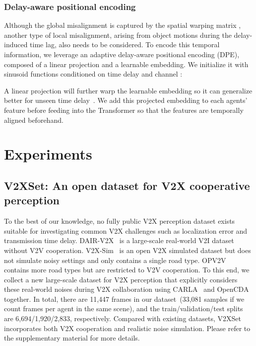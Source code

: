 \documentclass[runningheads]{llncs}
\begin{document}
\vspace{-3mm}
\subsubsection{Delay-aware positional encoding}
Although the global misalignment is captured by the spatial warping matrix , another type of local misalignment, arising from object motions during the delay-induced time lag, also needs to be considered.
To encode this temporal information, we leverage an adaptive delay-aware positional encoding (DPE), composed of a linear projection and a learnable embedding. We initialize it with sinusoid functions conditioned on time delay  and channel : 


A linear projection  will further warp the learnable embedding so it can generalize better for unseen time delay~\cite{hu2020heterogeneous}. We add this projected embedding to each agents' feature  before feeding into the Transformer so that the features are temporally aligned beforehand. 

\section{Experiments}
\subsection{V2XSet: An open dataset for V2X cooperative perception}
\label{sec:dataset}
To the best of our knowledge, no fully public V2X perception dataset exists suitable for investigating common V2X challenges such as localization error and transmission time delay.
DAIR-V2X~\cite{DAIR-V2X2021} is a large-scale real-world V2I dataset without V2V cooperation. V2X-Sim~\cite{Li_2021_RAL} is an open V2X simulated dataset but does not simulate noisy settings and only contains a single road type. OPV2V~\cite{xu2021opv2v} contains more road types but are restricted to V2V cooperation.
To this end, we collect a new large-scale dataset for V2X perception that explicitly considers these real-world noises during V2X collaboration using CARLA~\cite{Dosovitskiy17} and OpenCDA~\cite{xu2021opencda} together. 
In total, there are 11,447 frames in our dataset~(33,081 samples if we count frames per agent in the same scene), and the train/validation/test splits are 6,694/1,920/2,833, respectively. Compared with existing datasets, V2XSet incorporates both V2X cooperation and realistic noise simulation. Please refer to the supplementary material for more details.
\end{document}
